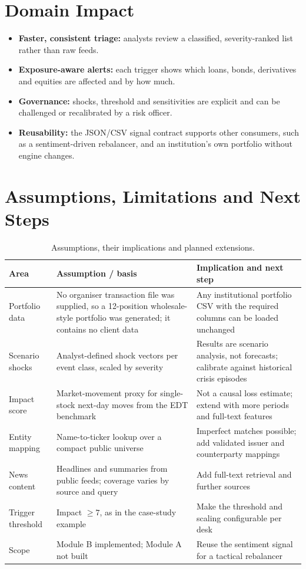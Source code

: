 \documentclass[11pt,a4paper]{article}
\begin{document}
\section{Domain Impact}
\begin{itemize}
\item \textbf{Faster, consistent triage:} analysts review a classified, severity-ranked list rather than raw feeds.
\item \textbf{Exposure-aware alerts:} each trigger shows which loans, bonds, derivatives and equities are affected and by how much.
\item \textbf{Governance:} shocks, threshold and sensitivities are explicit and can be challenged or recalibrated by a risk officer.
\item \textbf{Reusability:} the JSON/CSV signal contract supports other consumers, such as a sentiment-driven rebalancer, and an institution's own portfolio without engine changes.
\end{itemize}

\section{Assumptions, Limitations and Next Steps}
\begin{table}[!htbp]
\centering\small
\begin{tabularx}{\linewidth}{@{}P{3.1cm}YY@{}}
\toprule
\textbf{Area} & \textbf{Assumption / basis} & \textbf{Implication and next step}\\
\midrule
Portfolio data & No organiser transaction file was supplied, so a 12-position wholesale-style portfolio was generated; it contains no client data & Any institutional portfolio CSV with the required columns can be loaded unchanged\\
Scenario shocks & Analyst-defined shock vectors per event class, scaled by severity & Results are scenario analysis, not forecasts; calibrate against historical crisis episodes\\
Impact score & Market-movement proxy for single-stock next-day moves from the EDT benchmark & Not a causal loss estimate; extend with more periods and full-text features\\
Entity mapping & Name-to-ticker lookup over a compact public universe & Imperfect matches possible; add validated issuer and counterparty mappings\\
News content & Headlines and summaries from public feeds; coverage varies by source and query & Add full-text retrieval and further sources\\
Trigger threshold & Impact $\ge 7$, as in the case-study example & Make the threshold and scaling configurable per desk\\
Scope & Module B implemented; Module A not built & Reuse the sentiment signal for a tactical rebalancer\\
\bottomrule
\end{tabularx}
\caption{Assumptions, their implications and planned extensions.}
\end{table}
\end{document}
